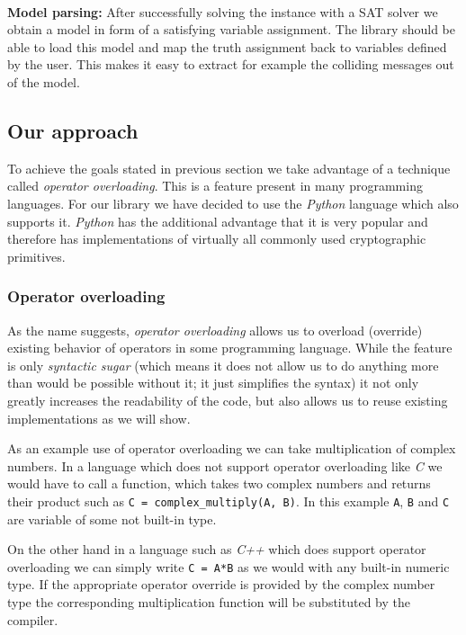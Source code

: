~\\
\textbf{Model parsing:}
After successfully solving the instance with a SAT solver we obtain a model in form of a satisfying variable assignment.
The library should be able to load this model and map the truth assignment back to variables defined by the user.
This makes it easy to extract for example the colliding messages out of the model.


\subsection{Our approach}
To achieve the goals stated in previous section we take advantage of a technique called \emph{operator overloading}.
This is a feature present in many programming languages.
For our library we have decided to use the \emph{Python} language which also supports it.
\emph{Python} has the additional advantage that it is very popular and therefore has implementations of virtually all commonly used cryptographic primitives.

\subsubsection{Operator overloading}
As the name suggests, \emph{operator overloading} allows us to overload (override) existing behavior of operators in some programming language.
While the feature is only \emph{syntactic sugar} (which means it does not allow us to do anything more than would be possible without it; it just simplifies the syntax) it not only greatly increases the readability of the code, but also allows us to reuse existing implementations as we will show.

As an example use of operator overloading we can take multiplication of complex numbers.
In a language which does not support operator overloading like \emph{C} we would have to call a function, which takes two complex numbers and returns their product such as \texttt{C = complex\_multiply(A, B)}.
In this example \texttt{A}, \texttt{B} and \texttt{C} are variable of some not built-in type.

On the other hand in a language such as \emph{C++} which does support operator overloading we can simply write \texttt{C = A*B} as we would with any built-in numeric type.
If the appropriate operator override is provided by the complex number type the corresponding multiplication function will be substituted by the compiler.

